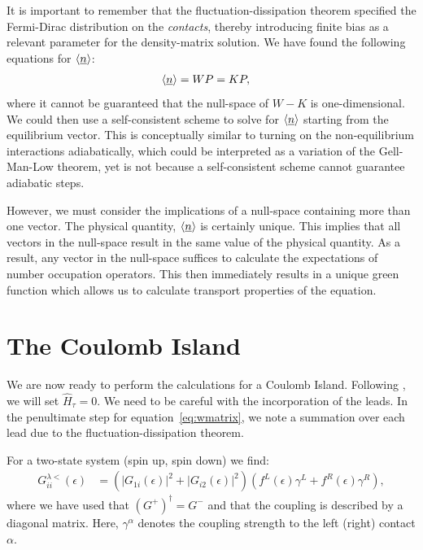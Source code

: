 \documentclass{article}
\begin{document}
\begin{multicols}{2}
        It is important to remember that the fluctuation-dissipation theorem specified the Fermi-Dirac distribution on the \emph{contacts}, thereby introducing finite bias as a relevant parameter for the density-matrix solution. We have found the following equations for $\braket{\underline{n}}$:
        \begin{align}
            \braket{\underline{n}} &= WP = KP\label{eq:selfconsistent},
        \end{align}
        where it cannot be guaranteed that the null-space of $W-K$ is one-dimensional. We could then use a self-consistent scheme to solve for $\braket{\underline{n}}$ starting from the equilibrium vector. This is conceptually similar to turning on the non-equilibrium interactions adiabatically, which could be interpreted as a variation of the Gell-Man-Low theorem\cite{gellmannlow, molinari}, yet is not because a self-consistent scheme cannot guarantee adiabatic steps.
        
        However, we must consider the implications of a null-space containing more than one vector. The physical quantity, $\braket{\underline{n}}$ is certainly unique. This implies that all vectors in the null-space result in the same value of the physical quantity. As a result, any vector in the null-space suffices to calculate the expectations of number occupation operators. This then immediately results in a unique green function which allows us to calculate transport properties of the equation.

    \section{The Coulomb Island}\label{sec:island}
        We are now ready to perform the calculations for a Coulomb Island. Following \citet{haugjauho}, we will set $\hat{H}_\tau = 0$. We need to be careful with the incorporation of the leads. In the penultimate step for equation~\ref{eq:wmatrix}, we note a summation over each lead due to the fluctuation-dissipation theorem. 
        
        For a two-state system (spin up, spin down) we find:
        \begin{align*}
            G^{\lambda<}_{ii}(\epsilon) &= \left(\left|G_{1i}(\epsilon)\right|^2 + \left|G_{i2}(\epsilon)\right|^2 \right)\left(f^L (\epsilon) \gamma^L+f^R (\epsilon) \gamma^R\right),
        \end{align*}
        where we have used that $(G^+)^\dagger=G^-$ and that the coupling is described by a diagonal matrix. Here, $\gamma^\alpha$ denotes the coupling strength to the left (right) contact $\alpha$.
        

\end{multicols}
\end{document}
